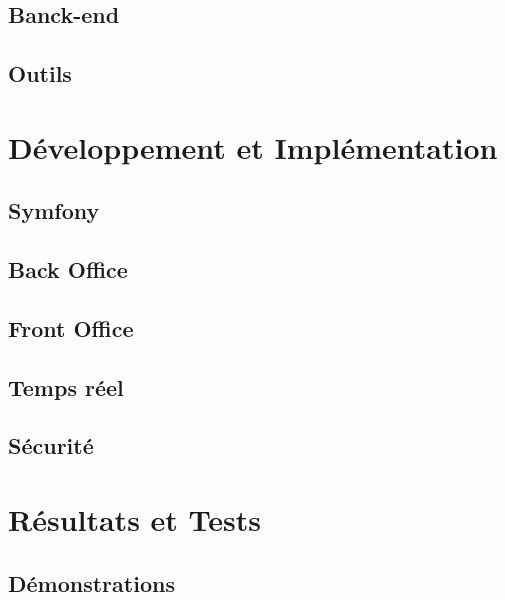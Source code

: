 \documentclass[12pt]{article}
\begin{document}
\subsection{Banck-end}

\subsection{Outils}

\newpage

\section{Développement et Implémentation}

\subsection{Symfony}

\subsection{Back Office}

\subsection{Front Office}

\subsection{Temps réel}

\subsection{Sécurité}

\newpage

\section{Résultats et Tests}

\subsection{Démonstrations}
\end{document}
